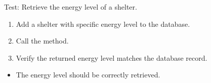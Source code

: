 \documentclass[letterpaper,10pt,english]{sphinxmanual}
\begin{document}
\begin{fulllineitems}
\label{\detokenize{test:test.test_shelter.test_get_shelter_energy_level_success}}
\pysigstartsignatures
\pysiglinewithargsret
{}
{}
{}
\pysigstopsignatures
\sphinxAtStartPar
Test: Retrieve the energy level of a shelter.
\begin{description}
\begin{enumerate}
%
\item {} 
\sphinxAtStartPar
Add a shelter with specific energy level to the database.

\item {} 
\sphinxAtStartPar
Call the  method.

\item {} 
\sphinxAtStartPar
Verify the returned energy level matches the database record.

\end{enumerate}

\begin{itemize}
\item {} 
\sphinxAtStartPar
The energy level should be correctly retrieved.

\end{itemize}

\end{description}

\end{fulllineitems}

\end{document}
